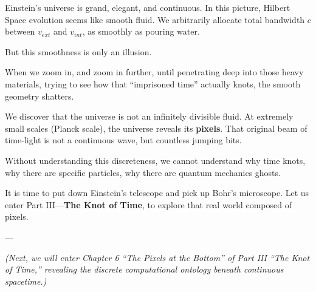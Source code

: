 Einstein's universe is grand, elegant, and continuous. In this picture, Hilbert Space evolution seems like smooth fluid. We arbitrarily allocate total bandwidth $c$ between $v_{ext}$ and $v_{int}$, as smoothly as pouring water.

But this smoothness is only an illusion.

When we zoom in, and zoom in further, until penetrating deep into those heavy materials, trying to see how that ``imprisoned time'' actually knots, the smooth geometry shatters.

We discover that the universe is not an infinitely divisible fluid. At extremely small scales (Planck scale), the universe reveals its \textbf{pixels}. That original beam of time-light is not a continuous wave, but countless jumping bits.

Without understanding this discreteness, we cannot understand why time knots, why there are specific particles, why there are quantum mechanics ghosts.

It is time to put down Einstein's telescope and pick up Bohr's microscope. Let us enter Part III---\textbf{The Knot of Time}, to explore that real world composed of pixels.

---

\textit{(Next, we will enter Chapter 6 ``The Pixels at the Bottom'' of Part III ``The Knot of Time,'' revealing the discrete computational ontology beneath continuous spacetime.)}

